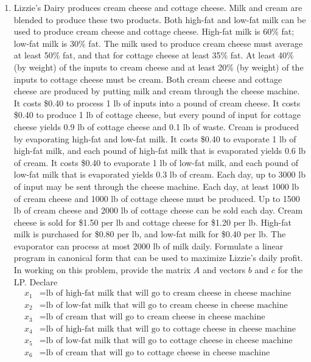 \documentclass{article}
\begin{document}
\begin{enumerate}
	\item Lizzie’s Dairy produces cream cheese and cottage cheese. Milk and cream are blended to produce these two products. Both high-fat and low-fat milk can be used to produce cream cheese and cottage cheese. High-fat milk is 60\% fat; low-fat milk is 30\% fat. The milk used to produce cream cheese must average at least 50\% fat, and that for cottage cheese at least 35\% fat. At least 40\% (by weight) of the inputs to cream cheese and at least 20\% (by weight) of the inputs to cottage cheese must be cream. Both cream cheese and cottage cheese are produced by putting milk and cream through the cheese machine. It costs \$0.40 to process 1 lb of inputs into a pound of cream cheese. It costs \$0.40 to produce 1 lb of cottage cheese, but every pound of input for cottage cheese yields 0.9 lb of cottage cheese and 0.1 lb of waste. Cream is produced by evaporating high-fat and low-fat milk. It costs \$0.40 to evaporate 1 lb of high-fat milk, and each pound of high-fat milk that is evaporated yields 0.6 lb of cream. It costs \$0.40 to evaporate 1 lb of low-fat milk, and each pound of low-fat milk that is evaporated yields 0.3 lb of cream. Each day, up to 3000 lb of input may be sent through the cheese machine. Each day, at least 1000 lb of cream cheese and 1000 lb of cottage cheese must be produced. Up to 1500 lb of cream cheese and 2000 lb of cottage cheese can be sold each day. Cream cheese is sold for \$1.50 per lb	and cottage cheese for \$1.20 per lb. High-fat milk is purchased for \$0.80 per lb, and low-fat milk for \$0.40 per lb. The evaporator can process at most 2000 lb of milk daily. Formulate a linear program in canonical form that can be used to maximize Lizzie’s daily profit.
		In working on this problem, provide the matrix $A$ and vectors $b$ and $c$ for the LP. Declare
		\begin{align*}
			x_1 &= \text{lb of high-fat milk that will go to cream cheese in cheese machine} \\
			x_2 &= \text{lb of low-fat milk that will go to cream cheese in cheese machine} \\
			x_3 &= \text{lb of cream that will go to cream cheese in cheese machine} \\
			x_4 &= \text{lb of high-fat milk that will go to cottage cheese in cheese machine} \\
			x_5 &= \text{lb of low-fat milk that will go to cottage cheese in cheese machine} \\
			x_6 &= \text{lb of cream that will go to cottage cheese in cheese machine} \\

\end{align*}
\end{enumerate}
\end{document}
